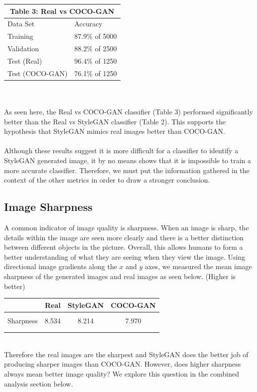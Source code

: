 \documentclass[12pt]{article}
\begin{document}
\begin{multicols*}{2}
\begin{tabular}{ |p{4cm}|p{3cm}|  }
             \hline
             \multicolumn{2}{|c|}{Table 3: Real vs COCO-GAN} \\
             \hline
            Data Set     & Accuracy\\
             \hline
            Training        & 87.9\% of 5000 \\
             \hline
            Validation      & 88.2\% of 2500 \\
             \hline
            Test (Real)     & 96.4\% of 1250 \\
             \hline
            Test (COCO-GAN) & 76.1\% of 1250 \\
             \hline
        \end{tabular}
        \\\\
        As seen here, the Real vs COCO-GAN classifier (Table 3) performed significantly better than the Real vs StyleGAN classifier (Table 2).
        This supports the hypothesis that StyleGAN mimics real images better than COCO-GAN.\\\\
        Although these results suggest it is more difficult for a classifier to identify a StyleGAN generated image, it by no means shows that it is impossible to train a more accurate classifier.
        Therefore, we must put the information gathered in the context of the other metrics in order to draw a stronger conclusion.

        \subsection{Image Sharpness}
        \label{subsec:imageSharpness}
        A common indicator of image quality is sharpness.
        When an image is sharp, the details within the image are seen more clearly and there is a better distinction between different objects in the picture.
        Overall, this allows humans to form a better understanding of what they are seeing when they view the image.
        Using directional image gradients along the $x$ and $y$ axes, we measured the mean image sharpness of the generated images and real images as seen below. (Higher is better)
        \\
        \begin{table}[h]
        \centering
        \begin{tabular}{cccc}
                 & Real & StyleGAN & COCO-GAN  \\ \hline \\
        Sharpness & 8.534    & 8.214      & 7.970     \\ \\ \hline \\
        \end{tabular}
        \end{table}
        \\
        Therefore the real images are the sharpest and StyleGAN does the better job of producing sharper images than COCO-GAN.
        However, does higher sharpness always mean better image quality?
        We explore this question in the combined analysis section below.


\end{multicols*}
\end{document}
